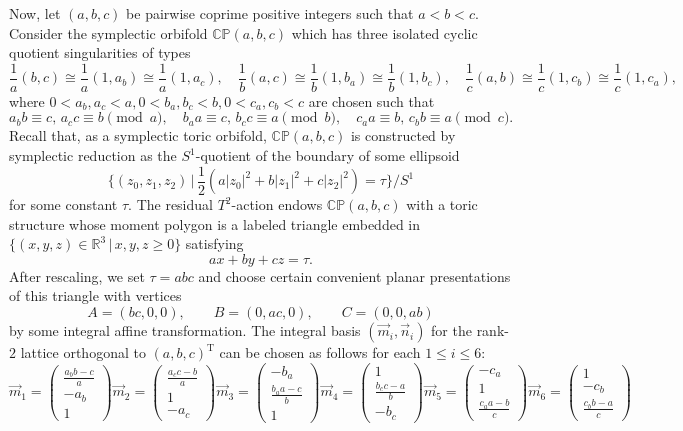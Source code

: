 \documentclass[11pt]{article}
\theoremstyle{definition}
\theoremstyle{remark}
\newcommand{\CP}{\mathbb{CP}}
\newcommand{\R}{\mathbb{R}}
\newcommand{\WCP}{\mathbb{CP}}
\begin{document}
 Now, let $(a,b,c)$ be pairwise coprime positive integers such that $a<b<c$. Consider the symplectic orbifold $\CP(a,b,c)$ which has three isolated cyclic quotient singularities of types
\[
\frac{1}{a}(b,c)\cong\frac{1}{a}(1,a_b)\cong\frac{1}{a}(1,a_c), \quad \frac{1}{b}(a,c)\cong\frac{1}{b}(1,b_a)\cong\frac{1}{b}(1,b_c), \quad \frac{1}{c}(a,b)\cong\frac{1}{c}(1,c_b)\cong\frac{1}{c}(1,c_a),
\]
where $0<a_b,a_c<a,0<b_a,b_c<b,0<c_a,c_b<c$ are chosen such that
\[
a_b b\equiv c,
\,
a_c c\equiv b\pmod a,
\quad
b_a a\equiv c,
\,
b_c c\equiv a\pmod b,
\quad
c_a a\equiv b,
\,
c_b b\equiv a\pmod c.
\]
Recall that, as a symplectic toric orbifold, $\CP(a,b,c)$ is constructed by symplectic reduction as the $S^1$-quotient of the boundary of some ellipsoid
  \[\{(z_0,z_1,z_2)\,|\,\frac{1}{2}(a|z_0|^2+b|z_1|^2+c|z_2|^2)=\tau\}/S^1\] for some constant $\tau$.
  The residual $T^{2}$-action endows $\WCP(a,b,c)$ with a toric structure whose moment polygon is a labeled triangle embedded in $\{(x,y,z)\in \R^{3}\,|\,x,y,z\geq 0\}$ satisfying
\[
 ax+by+cz=\tau.
\]
After rescaling, we set $\tau=abc$ and choose certain convenient planar presentations of this triangle with vertices
\[
  A=(bc,0,0),\qquad B=(0,ac,0),\qquad C=(0,0,ab)
\]
 by some integral affine transformation. The integral basis $(\vec{m}_i,\vec{n}_i)$ for the rank-$2$ lattice orthogonal to $(a,b,c)^\text{T}$ can be chosen as follows for each $1\leq i \leq 6$:
 \[\vec{m}_1=\begin{pmatrix}\frac{a_bb-c}{a}\\-a_b\\1\end{pmatrix}
  \vec{m}_2=\begin{pmatrix}\frac{a_cc-b}{a}\\1\\-a_c\end{pmatrix}
  \vec{m}_3=\begin{pmatrix}-b_a\\ \frac{b_aa-c}{b}\\1\end{pmatrix}
   \vec{m}_4=\begin{pmatrix}1\\ \frac{b_cc-a}{b}\\-b_c\end{pmatrix}
    \vec{m}_5=\begin{pmatrix}-c_a\\1\\ \frac{c_aa-b}{c}\end{pmatrix}
    \vec{m}_6=\begin{pmatrix}1\\ -c_b\\ \frac{c_bb-a}{c}\end{pmatrix}\]
\end{document}
